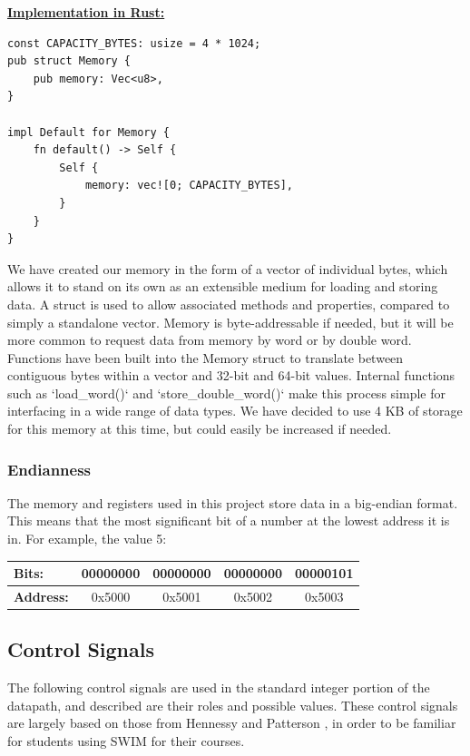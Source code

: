 \documentclass[
    paper=letter,
    parskip=half,
    fontsize=12pt,
    titlepage=firstiscover,
    toc=bibliography,
    numbers=endperiod
]{scrartcl}
\begin{document}
\underline{\textbf{Implementation in Rust:}}
\begin{verbatim}
const CAPACITY_BYTES: usize = 4 * 1024;
pub struct Memory {
    pub memory: Vec<u8>,
}

impl Default for Memory {
    fn default() -> Self {
        Self {
            memory: vec![0; CAPACITY_BYTES],
        }
    }
}
\end{verbatim}

We have created our memory in the form of a vector of individual bytes,
which allows it to stand on its own as an extensible medium for loading
and storing data. A struct is used to allow associated methods and
properties, compared to simply a standalone vector. Memory is
byte-addressable if needed, but it will be more common to request data
from memory by word or by double word. Functions have been built into
the Memory struct to translate between contiguous bytes within a vector
and 32-bit and 64-bit values. Internal functions such as `load\_word()`
and `store\_double\_word()` make this process simple for interfacing in
a wide range of data types. We have decided to use 4 KB of storage for
this memory at this time, but could easily be increased if needed.


\subsubsection{Endianness}


The memory and registers used in this project store data in a big-endian
format. This means that the most significant bit of a number at the
lowest address it is in. For example, the value 5:

\begin{tabularx}{\textwidth}{|l|c|c|c|c|}
    \hline
    \textbf{Bits:}    & 00000000 & 00000000 & 00000000 & 00000101 \\\hline
    \textbf{Address:} & 0x5000   & 0x5001   & 0x5002   & 0x5003 \\\hline
\end{tabularx}

\subsection{Control Signals}

The following control signals are used in the standard integer portion
of the datapath, and described are their roles and possible values.
These control signals are largely based on those from Hennessy and
Patterson \cite{hennessy-patterson}, in order to be familiar for students using SWIM for their
courses.
\end{document}

